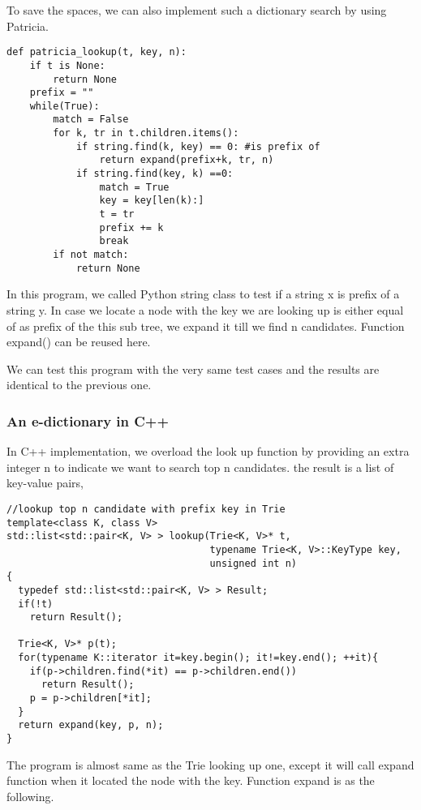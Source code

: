\documentclass{article}
\begin{document}
To save the spaces, we can also implement such a dictionary search by using
Patricia.

\begin{lstlisting}
def patricia_lookup(t, key, n):
    if t is None:
        return None
    prefix = ""
    while(True):
        match = False
        for k, tr in t.children.items():
            if string.find(k, key) == 0: #is prefix of
                return expand(prefix+k, tr, n)
            if string.find(key, k) ==0:
                match = True
                key = key[len(k):]
                t = tr
                prefix += k
                break
        if not match:
            return None
\end{lstlisting}

In this program, we called Python string class to test if a string x is
prefix of a string y. In case we locate a node with the key we are looking
up is either equal of as prefix of the this sub tree, we expand it till
we find n candidates. Function expand() can be reused here.

We can test this program with the very same test cases and the results are
identical to the previous one.

\subsubsection*{An e-dictionary in C++}

In C++ implementation, we overload the look up function by providing an
extra integer n to indicate we want to search top n candidates. the
result is a list of key-value pairs, 

\lstset{language=C++}
\begin{lstlisting}
//lookup top n candidate with prefix key in Trie
template<class K, class V>
std::list<std::pair<K, V> > lookup(Trie<K, V>* t, 
                                   typename Trie<K, V>::KeyType key, 
                                   unsigned int n)
{
  typedef std::list<std::pair<K, V> > Result;
  if(!t)
    return Result();

  Trie<K, V>* p(t);
  for(typename K::iterator it=key.begin(); it!=key.end(); ++it){
    if(p->children.find(*it) == p->children.end())
      return Result();
    p = p->children[*it];
  }
  return expand(key, p, n);
}
\end{lstlisting}

The program is almost same as the Trie looking up one, except it will
call expand function when it located the node with the key. Function
expand is as the following.
\end{document}
